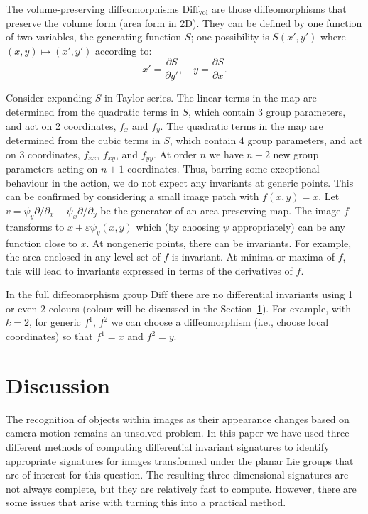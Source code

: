 \documentclass[review,onefignum,onetabnum]{siamonline190516}
\begin{document}
The volume-preserving diffeomorphisms $\mathrm{Diff}_{\mathrm{vol}}$ are those diffeomorphisms that preserve the volume form (area form in 2D). They can be defined by one function of two variables, the generating function $S$; one possibility is $S(x',y')$ where $(x,y)\mapsto(x',y')$ according to:
$$ x'=\frac{\partial S}{\partial y'},\quad y = \frac{\partial S}{\partial x}.$$

Consider expanding $S$ in Taylor series. The linear terms in the map are determined from the quadratic terms in $S$, which contain 3 group parameters, and act on 2 coordinates, $f_x$ and $f_y$.  The quadratic terms in the map are determined from the cubic terms in $S$, which contain 4 group parameters, and act on 3 coordinates, $f_{xx}$, $f_{xy}$, and $f_{yy}$. At order $n$ we have $n+2$ new group parameters acting on $n+1$ coordinates. Thus, barring some exceptional behaviour in the action, we do not expect any invariants at generic points. This can be confirmed by considering a small image patch with $f(x,y)=x.$ Let $v=\psi_y\partial/\partial_x - \psi_x\partial/\partial_y$ be the generator of an area-preserving map. The image $f$ transforms to $x + \varepsilon \psi_y(x,y)$ which (by choosing $\psi$ appropriately) can be any function close to $x$.
At nongeneric points, there can be invariants. For example, the area enclosed in any level set of $f$ is invariant. At minima or maxima of $f$, this will lead to invariants expressed in terms of the derivatives of $f$.

In the full diffeomorphism group $\mathrm{Diff}$ there are no differential invariants using 1 or even 2 colours (colour will be discussed in the Section~\ref{sec:colour}). For example, with $k=2$, for generic $f^1$, $f^2$ we can choose a diffeomorphism (i.e., choose local coordinates) so that $f^1=x$ and $f^2=y$.

\section{Discussion}\label{sec:colour}


The recognition of objects within images as their appearance changes based on camera motion remains an unsolved problem. In this paper we have used three different methods of computing differential invariant signatures to identify appropriate signatures for images transformed under the planar Lie groups that are of interest for this question. The resulting three-dimensional signatures are not always complete, but they are relatively fast to compute. However, there are some issues that arise with turning this into a practical method. 
\end{document}
